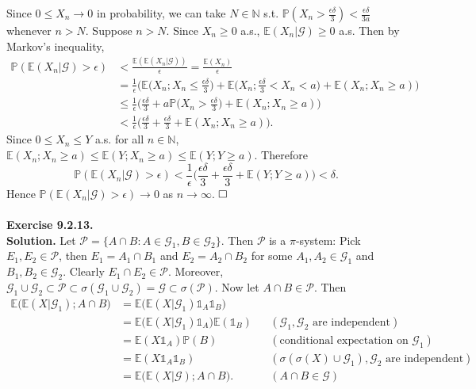 \documentclass[12pt]{extarticle}
\begin{document}
Since $0\leq X_n\rightarrow 0$ in probability, we can take $N\in\mathbb{N}$ s.t. $\mathbb{P}(X_n>\frac{\epsilon\delta}{3})<\frac{\epsilon\delta}{3a}$ whenever $n>N$. 
Suppose $n>N$. Since $X_n\geq 0$ a.s., $\mathbb{E}(X_n|\mathcal{G})\geq 0$ a.s. Then by Markov's inequality,
\begin{equation*}
\begin{aligned}
\mathbb{P}(\mathbb{E}(X_n|\mathcal{G})>\epsilon) &< \frac{\mathbb{E}(\mathbb{E}(X_n|\mathcal{G}))}{\epsilon}=\frac{\mathbb{E}(X_n)}{\epsilon} \\&
=\frac{1}{\epsilon}\Big(
\mathbb{E}\Big(X_n;X_n\leq\frac{\epsilon\delta}{3}\Big)+\mathbb{E}\Big(X_n;\frac{\epsilon\delta}{3}<X_n<a\Big)+\mathbb{E}(X_n;X_n\geq a)
\Big) \\&
\leq\frac{1}{\epsilon}\Big(
\frac{\epsilon\delta}{3}+a\mathbb{P}\Big(X_n>\frac{\epsilon\delta}{3}\Big)+\mathbb{E}(X_n;X_n\geq a)
\Big) \\&
<\frac{1}{\epsilon}\Big(\frac{\epsilon\delta}{3}+\frac{\epsilon\delta}{3}+\mathbb{E}(X_n;X_n\geq a)
\Big).
\end{aligned}
\end{equation*}
Since $0\leq X_n\leq Y$ a.s. for all $n\in\mathbb{N}$, $\mathbb{E}(X_n;X_n\geq a)\leq\mathbb{E}(Y;X_n\geq a)\leq\mathbb{E}(Y;Y\geq a)$. Therefore
\begin{equation*}
\mathbb{P}(\mathbb{E}(X_n|\mathcal{G})>\epsilon)<\frac{1}{\epsilon}\Big(\frac{\epsilon\delta}{3}+\frac{\epsilon\delta}{3}+\mathbb{E}(Y;Y\geq a)\Big)
<\delta.
\end{equation*}
Hence $\mathbb{P}(\mathbb{E}(X_n|\mathcal{G})>\epsilon)\rightarrow 0$ as $n\rightarrow\infty$.
$\hspace{\fill}\square$
\\ \\
\textbf{Exercise 9.2.13.}\\
\textbf{Solution.} Let $\mathcal{P}=\{A\cap B:A\in\mathcal{G}_1,B\in\mathcal{G}_2\}$. Then $\mathcal{P}$ is a $\pi$-system: Pick $E_1,E_2\in\mathcal{P}$, then $E_1=A_1\cap B_1$ and $E_2=A_2\cap B_2$ for some $A_1,A_2\in\mathcal{G}_1$ and $B_1,B_2\in\mathcal{G}_2$. Clearly $E_1\cap E_2\in\mathcal{P}$. Moreover, $\mathcal{G}_1\cup\mathcal{G}_2\subset \mathcal{P}\subset\sigma(\mathcal{G}_1\cup\mathcal{G}_2)=\mathcal{G}\subset\sigma(\mathcal{P})$. Now let $A\cap B\in\mathcal{P}$. Then 
\begin{equation*}
\begin{aligned}
\mathbb{E}\big(\mathbb{E}(X|\mathcal{G}_1); A\cap B\big) &= \mathbb{E}\big(\mathbb{E}(X|\mathcal{G}_1)\mathds{1}_A\mathds{1}_B\big) \\&
=\mathbb{E}\big(\mathbb{E}(X|\mathcal{G}_1)\mathds{1}_A\big)\mathbb{E}(\mathds{1}_B) && (\mathcal{G}_1,\mathcal{G}_2 \text{ are independent}) \\&
=\mathbb{E}(X\mathds{1}_A)\mathbb{P}(B) && (\text{conditional expectation on }\mathcal{G}_1) \\&
=\mathbb{E}(X\mathds{1}_A\mathds{1}_B) && (\sigma(\sigma(X)\cup\mathcal{G}_1),\mathcal{G}_2\text{ are independent}) \\&
=\mathbb{E}\big(\mathbb{E}(X|\mathcal{G});A\cap B\big). && (A\cap B\in\mathcal{G})
\end{aligned}
\end{equation*}
\end{document}
